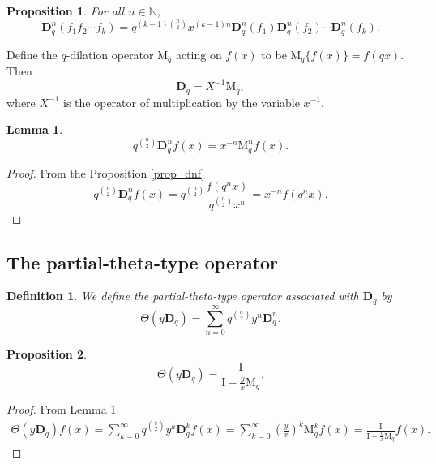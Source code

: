 \documentclass[12pt]{article}
\newcommand{\N}{\mathbb{N}}
\newcommand{\M}{\mathrm{M}}
\newcommand{\I}{\mathrm{I}}
\newcommand{\D}{\mathbf{D}}
\newcommand{\thp}{\Theta}
\newtheorem{lemma}{Lemma}
\newtheorem{definition}{Definition}
\newtheorem{proposition}{Proposition}
\newtheorem{remark}{Remark}
\begin{document}
\begin{proposition}
For all $n\in\N$,
\begin{equation}
    \D_{q}^n(f_{1}f_{2}\cdots f_{k})=q^{(k-1)\binom{n}{2}}x^{(k-1)n}\D_{q}^n(f_{1})\D_{q}^n(f_{2})\cdots\D_{q}^n(f_{k}).
\end{equation}
\end{proposition}

Define the $q$-dilation operator $\M_{q}$ acting on $f(x)$ to be $\M_{q}\{f(x)\}=f(q x)$. Then 
\begin{equation}
    \D_q=X^{-1}\M_q,
\end{equation}
where $X^{-1}$ is the operator of multiplication by the variable $x^{-1}$.

\begin{lemma}\label{lem_powD}
    \begin{equation}
        q^{\binom{n}{2}}\D_q^nf(x)=x^{-n}\M_q^nf(x).
    \end{equation}
\end{lemma}
\begin{proof}
From the Proposition \ref{prop_dnf}
\begin{equation}
    q^{\binom{n}{2}}\D_q^nf(x)=q^{\binom{n}{2}}\frac{f(q^nx)}{q^{\binom{n}{2}}x^n}=x^{-n}f(q^nx).
\end{equation}
\end{proof}

    

\subsection{The partial-theta-type operator}

\begin{definition}\label{def_PTO}
We define the partial-theta-type operator associated with $\D_{q}$ by
\begin{equation*}
    \thp(y\D_{q})=\sum_{n=0}^{\infty}q^{\binom{n}{2}}y^n\D_{q}^n.
\end{equation*}
\end{definition}

\begin{proposition}\label{prop_import}
    \begin{equation}
        \thp(y\D_q)=\frac{\I}{\I-\frac{y}{x}\M_q}.
    \end{equation}
\end{proposition}
\begin{proof}
From Lemma \ref{lem_powD}
\begin{align*}
    \thp(y\D_{q})f(x)=\sum_{k=0}^{\infty}q^{\binom{k}{2}}y^{k}\D_{q}^kf(x)=\sum_{k=0}^{\infty}\left(\frac{y}{x}\right)^k\M_q^kf(x)=\frac{\I}{\I-\frac{y}{x}\M_{q}}f(x).
\end{align*}
\end{proof}
\end{document}
